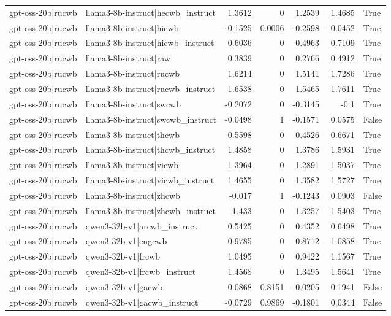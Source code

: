 \begin{table}
\begin{tabular}{l l r r r r l}
gpt-oss-20b|rucwb & llama3-8b-instruct|hecwb_instruct & 1.3612 & 0 & 1.2539 & 1.4685 & True \\
gpt-oss-20b|rucwb & llama3-8b-instruct|hicwb & -0.1525 & 0.0006 & -0.2598 & -0.0452 & True \\
gpt-oss-20b|rucwb & llama3-8b-instruct|hicwb_instruct & 0.6036 & 0 & 0.4963 & 0.7109 & True \\
gpt-oss-20b|rucwb & llama3-8b-instruct|raw & 0.3839 & 0 & 0.2766 & 0.4912 & True \\
gpt-oss-20b|rucwb & llama3-8b-instruct|rucwb & 1.6214 & 0 & 1.5141 & 1.7286 & True \\
gpt-oss-20b|rucwb & llama3-8b-instruct|rucwb_instruct & 1.6538 & 0 & 1.5465 & 1.7611 & True \\
gpt-oss-20b|rucwb & llama3-8b-instruct|swcwb & -0.2072 & 0 & -0.3145 & -0.1 & True \\
gpt-oss-20b|rucwb & llama3-8b-instruct|swcwb_instruct & -0.0498 & 1 & -0.1571 & 0.0575 & False \\
gpt-oss-20b|rucwb & llama3-8b-instruct|thcwb & 0.5598 & 0 & 0.4526 & 0.6671 & True \\
gpt-oss-20b|rucwb & llama3-8b-instruct|thcwb_instruct & 1.4858 & 0 & 1.3786 & 1.5931 & True \\
gpt-oss-20b|rucwb & llama3-8b-instruct|vicwb & 1.3964 & 0 & 1.2891 & 1.5037 & True \\
gpt-oss-20b|rucwb & llama3-8b-instruct|vicwb_instruct & 1.4655 & 0 & 1.3582 & 1.5727 & True \\
gpt-oss-20b|rucwb & llama3-8b-instruct|zhcwb & -0.017 & 1 & -0.1243 & 0.0903 & False \\
gpt-oss-20b|rucwb & llama3-8b-instruct|zhcwb_instruct & 1.433 & 0 & 1.3257 & 1.5403 & True \\
gpt-oss-20b|rucwb & qwen3-32b-v1|arcwb_instruct & 0.5425 & 0 & 0.4352 & 0.6498 & True \\
gpt-oss-20b|rucwb & qwen3-32b-v1|engcwb & 0.9785 & 0 & 0.8712 & 1.0858 & True \\
gpt-oss-20b|rucwb & qwen3-32b-v1|frcwb & 1.0495 & 0 & 0.9422 & 1.1567 & True \\
gpt-oss-20b|rucwb & qwen3-32b-v1|frcwb_instruct & 1.4568 & 0 & 1.3495 & 1.5641 & True \\
gpt-oss-20b|rucwb & qwen3-32b-v1|gacwb & 0.0868 & 0.8151 & -0.0205 & 0.1941 & False \\
gpt-oss-20b|rucwb & qwen3-32b-v1|gacwb_instruct & -0.0729 & 0.9869 & -0.1801 & 0.0344 & False \\

\end{tabular}
\end{table}
